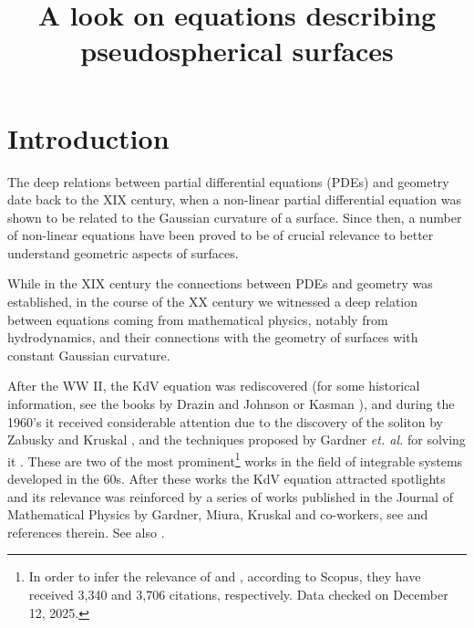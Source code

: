 \documentclass{cimart}
\title{A look on equations describing pseudospherical surfaces}
\begin{document}
\section{Introduction}

The deep relations between partial differential equations (PDEs) and geometry date back to the XIX century, when a non-linear partial differential equation was shown to be related to the Gaussian curvature of a surface. Since then, a number of non-linear equations have been proved to be of crucial relevance to better understand geometric aspects of surfaces.  

While in the XIX century the connections between PDEs and geometry was established, in the course of the XX century we witnessed a deep relation between equations coming from mathematical physics, notably from hydrodynamics, and their connections with the geometry of surfaces with constant Gaussian curvature. 

After the WW II, the KdV equation was rediscovered (for some historical information, see the books by Drazin and Johnson \cite{drazin} or Kasman \cite{kasman}), and during the 1960's it received considerable attention due to the discovery of the soliton by Zabusky and Kruskal \cite{zab}, and the techniques proposed by Gardner {\it et. al.} for solving it \cite{gardprl}. These are two of the most prominent\footnote{In order to infer the relevance of \cite{zab} and \cite{gardprl}, according to Scopus, they have received 3,340 and 3,706 citations, respectively. Data checked on December 12, 2025.} works in the field of integrable systems developed in the 60s. After these works the KdV equation attracted spotlights and its relevance was reinforced by a series of works published in the Journal of Mathematical Physics by Gardner, Miura, Kruskal and co-workers, see \cite{miura} and references therein. See also \cite{drazin,kasman}.
\end{document}

